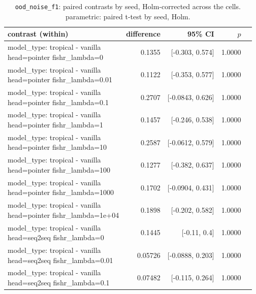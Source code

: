 \documentclass[10pt]{article}
\makeatletter
\newcommand{\stackcell}[1]{\begin{tabular}[t]{@{}l@{}}#1\end{tabular}}
\makeatother
\begin{document}
{\small
\begin{longtable}{lrrrl}
\caption{\texttt{ood\_noise\_f1}: paired contrasts by seed, Holm-corrected across the cells. parametric: paired t-test by seed, Holm.}\label{tab:paired-ood_noise_f1}\\
\toprule
contrast (within) & difference & 95\% CI & $p$ & \\
\midrule
\endhead
\stackcell{model\_type: tropical - vanilla\\\footnotesize head=pointer fishr\_lambda=0 } & 0.1355 & [-0.303, 0.574] & 1.0000 & \\
\stackcell{model\_type: tropical - vanilla\\\footnotesize head=pointer fishr\_lambda=0.01 } & 0.1122 & [-0.353, 0.577] & 1.0000 & \\
\stackcell{model\_type: tropical - vanilla\\\footnotesize head=pointer fishr\_lambda=0.1 } & 0.2707 & [-0.0843, 0.626] & 1.0000 & \\
\stackcell{model\_type: tropical - vanilla\\\footnotesize head=pointer fishr\_lambda=1 } & 0.1457 & [-0.246, 0.538] & 1.0000 & \\
\stackcell{model\_type: tropical - vanilla\\\footnotesize head=pointer fishr\_lambda=10 } & 0.2587 & [-0.0612, 0.579] & 1.0000 & \\
\stackcell{model\_type: tropical - vanilla\\\footnotesize head=pointer fishr\_lambda=100 } & 0.1277 & [-0.382, 0.637] & 1.0000 & \\
\stackcell{model\_type: tropical - vanilla\\\footnotesize head=pointer fishr\_lambda=1000 } & 0.1702 & [-0.0904, 0.431] & 1.0000 & \\
\stackcell{model\_type: tropical - vanilla\\\footnotesize head=pointer fishr\_lambda=1e+04 } & 0.1898 & [-0.202, 0.582] & 1.0000 & \\
\stackcell{model\_type: tropical - vanilla\\\footnotesize head=seq2seq fishr\_lambda=0 } & 0.1445 & [-0.11, 0.4] & 1.0000 & \\
\stackcell{model\_type: tropical - vanilla\\\footnotesize head=seq2seq fishr\_lambda=0.01 } & 0.05726 & [-0.0888, 0.203] & 1.0000 & \\
\stackcell{model\_type: tropical - vanilla\\\footnotesize head=seq2seq fishr\_lambda=0.1 } & 0.07482 & [-0.115, 0.264] & 1.0000 & \\

\end{longtable}}
\end{document}

